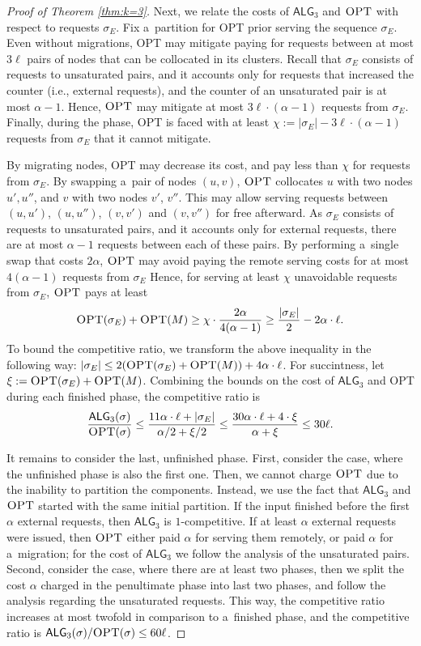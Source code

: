 \documentclass[a4paper,anonymous,USenglish]{lipics-v2019}
\newcommand{\OPT}{\textsc{OPT}\xspace}
\newcommand{\TAlg}{{\ensuremath{\textsf{ALG}_{3}}}\xspace}
\begin{document}
\begin{proof}[Proof of Theorem \ref{thm:k=3}]
	Next, we relate the costs of $\TAlg$ and $\OPT$ with respect to requests $\sigma_E$.
	Fix a~partition for \OPT prior serving the sequence $\sigma_E$.
	Even without migrations, \OPT may mitigate paying for requests between at most $3\ell$ pairs of nodes that can be collocated in its clusters.
	Recall that $\sigma_E$ consists of requests to unsaturated pairs, and it accounts only for requests that increased the counter (i.e., external requests), and the counter of an unsaturated pair is at most $\alpha - 1$.
	Hence, $\OPT$ may mitigate at most $3\ell\cdot(\alpha - 1)$ requests from $\sigma_E$.
	Finally, during the phase, \OPT is faced with at least $\chi := |\sigma_E| - 3\ell\cdot(\alpha-1)$ requests from $\sigma_E$ that it cannot mitigate.

	By migrating nodes, \OPT may decrease its cost, and pay less than $\chi$ for requests from $\sigma_E$.
	By swapping a~pair of nodes $(u,v)$, $\OPT$ collocates $u$ with two nodes $u', u''$, and $v$ with two nodes $v'$, $v''$.
	This may allow serving requests between $(u,u')$, $(u,u'')$, $(v,v')$ and $(v,v'')$ for free afterward.
	As $\sigma_E$ consists of requests to unsaturated pairs, and it accounts only for external requests, there are at most $\alpha-1$ requests between each of these pairs.
	By performing a~single swap that costs $2\alpha$, $\OPT$ may avoid paying the remote serving costs for at most $4 (\alpha - 1)$ requests from $\sigma_E$
	Hence, for serving at least $\chi$ unavoidable requests from $\sigma_E$, $\OPT$ pays at least
	\[
		\OPT(\sigma_E) + \OPT(M) \geq \chi \cdot \frac{2\alpha}{4 (\alpha-1)}\geq \frac{|\sigma_E|} {2} - 2 \alpha \cdot \ell.
	\]
	To bound the competitive ratio, we transform the above inequality in the following way: $|\sigma_E| \leq 2(\OPT(\sigma_E)+\OPT(M)) + 4\alpha \cdot \ell$.
	For succintness, let $\xi := \OPT(\sigma_E) + \OPT(M)$.
	Combining the bounds on the cost of \TAlg and \OPT during each finished phase, the competitive ratio is
%
	\[
		\frac{\TAlg(\sigma)}{\OPT(\sigma)} \leq \frac{11\alpha \cdot \ell + |\sigma_E|}{\alpha/2 + \xi/2} \leq \frac{30\alpha\cdot\ell + 4\cdot \xi}{\alpha + \xi} \leq 30 \ell.
	\]
%	
	\medskip
	
	It remains to consider the last, unfinished phase.
	First, consider the case, where the unfinished phase is also the first one.
	Then, we cannot charge $\OPT$ due to the inability to partition the components.
	Instead, we use the fact that \TAlg and $\OPT$ started with the same initial partition.
	If the input finished before the first $\alpha$ external requests, then \TAlg is $1$-competitive.
	If at least $\alpha$ external requests were issued, then $\OPT$ either paid $\alpha$ for serving them remotely, or paid $\alpha$ for a~migration; for the cost of \TAlg we follow the analysis of the unsaturated pairs.
	Second, consider the case, where there are at least two phases, then we split the cost $\alpha$ charged in the penultimate phase into last two phases, and follow the analysis regarding the unsaturated requests.
	This way, the competitive ratio increases at most twofold in comparison to a~finished phase, and the competitive ratio is $\TAlg(\sigma)/\OPT(\sigma) \leq 60\ell$.
\end{proof}
\end{document}
